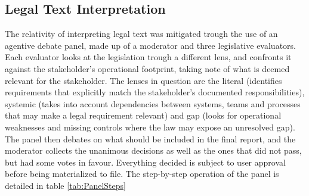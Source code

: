 \subsection{Legal Text Interpretation}

The relativity of interpreting legal text was mitigated trough the use of an agentive debate panel, made up of a moderator and three legislative evaluators. Each evaluator looks at the legislation trough a different lens, and confronts it against the stakeholder's operational footprint, taking note of what is deemed relevant for the stakeholder. The lenses in question are the literal (identifies requirements that explicitly match the stakeholder's documented responsibilities), systemic (takes into account dependencies between systems, teams and processes that may make a legal requirement relevant) and gap (looks for operational weaknesses and missing controls where the law may expose an unresolved gap). The panel then debates on what should be included in the final report, and the moderator collects the unanimous decisions as well as the ones that did not pass, but had some votes in favour. Everything decided is subject to user approval before being materialized to file. The step-by-step operation of the panel is detailed in table \ref{tab:PanelSteps} 

